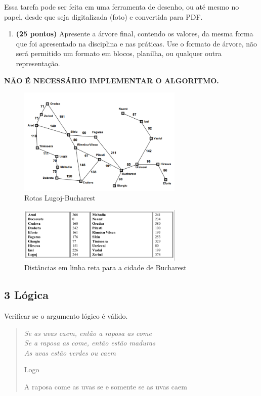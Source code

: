     Essa tarefa pode ser feita em uma ferramenta de desenho, ou até mesmo no papel, desde que seja digitalizada (foto) e convertida para PDF.
    \begin{enumerate}[label=\alph*)]
        \item \textbf{(25 pontos)} Apresente a árvore final, contendo os valores, da mesma forma que foi apresentado na disciplina e nas práticas. Use o formato de árvore, não será permitido um formato em blocos, planilha, ou qualquer outra representação.
    \end{enumerate}

    \textbf{NÃO É NECESSÁRIO IMPLEMENTAR O ALGORITMO.}
    \begin{figure}[H]
        \centering
        \includegraphics[width=0.7\textwidth]{apendices/fig/1_IAA001_1.png} 
        \caption{Rotas Lugoj-Bucharest}
    \end{figure}
    \begin{figure}[H]
        \centering
        \includegraphics[width=0.7\textwidth]{apendices/fig/1_IAA001_2.png} 
        \caption{Distâncias em linha reta para a cidade de Bucharest}
    \end{figure}

\subsection*{\textbf{3 Lógica}}
    Verificar se o argumento lógico é válido.

    \begin{adjustwidth}{3em}{}
        \begin{quote}
            \itshape
            Se as uvas caem, então a raposa as come \\
            Se a raposa as come, então estão maduras \\
            As uvas estão verdes ou caem

            Logo

            A raposa come as uvas se e somente se as uvas caem
        \end{quote}
    \end{adjustwidth}


